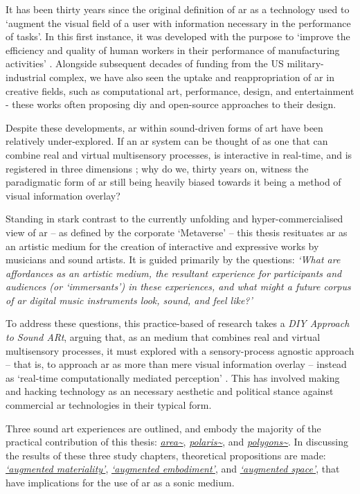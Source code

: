 \begin{SingleSpace}
    It has been thirty years since the original definition of \ac{ar} as a technology used to `augment the visual field of a user with information necessary in the performance of tasks'. In this first instance, it was developed with the purpose to `improve the efficiency and quality of human workers in their performance of manufacturing activities' \citep{caudell1992}. Alongside subsequent decades of funding from the US military-industrial complex, we have also seen the uptake and reappropriation of \ac{ar} in creative fields, such as computational art, performance, design, and entertainment - these works often proposing \ac{diy} and open-source approaches to their design. 

    Despite these developments, \ac{ar} within sound-driven forms of art have been relatively under-explored. If an \ac{ar} system can be thought of as one that can combine real and virtual multisensory processes, is interactive in real-time, and is registered in three dimensions \citep{azuma1997}; why do we, thirty years on, witness the paradigmatic form of \ac{ar} still being heavily biased \citep{billinghurst2015} towards it being a method of visual information overlay?
    
    Standing in stark contrast to the currently unfolding and hyper-commercialised view of \ac{ar} -- as defined by the corporate `Metaverse' -- this thesis resituates \ac{ar} as an artistic medium for the creation of interactive and expressive works by musicians and sound artists. It is guided primarily by the questions: \textit{`What are  affordances as an artistic medium, the resultant experience for participants and audiences (or `immersants') in these experiences, and what might a future corpus of \ac{ar} digital music instruments look, sound, and feel like?'}
    
    To address these questions, this practice-based of research takes a \textit{DIY Approach to Sound ARt}, arguing that, as an medium that combines real and virtual multisensory processes, it must explored with a sensory-process agnostic approach -- that is, to approach \ac{ar} as more than mere visual information overlay -- instead as `real-time computationally mediated perception' \citep{chevalier2020}. This has involved making and hacking technology as an necessary aesthetic and political stance against commercial \ac{ar} technologies in their typical form.
    
    Three sound \ac{art} experiences are outlined, and embody the majority of the practical contribution of this thesis: \textit{\hyperref[sec: area]{area\textasciitilde{}}}, \textit{\hyperref[sec: polaris]{polaris\textasciitilde{}}}, and \textit{\hyperref[sec: polygons]{polygons\textasciitilde{}}}. In discussing the results of these three study chapters, theoretical propositions are made: \textit{\hyperref[sec: discussion-medium-material]{`augmented materiality'}}, \textit{\hyperref[sec: discussion-medium-embodiment]{`augmented embodiment'}}, and \textit{\hyperref[sec: discussion-medium-space]{`augmented space'}}, that have implications for the use of \ac{ar} as a sonic medium.
    

\end{SingleSpace}
